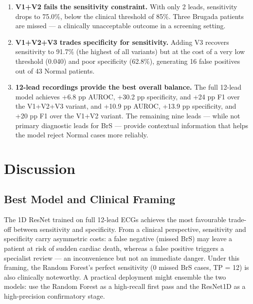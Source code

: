 \documentclass[journal, 10pt, twoside]{IEEEtran}
\begin{document}
\begin{enumerate}
  \item \textbf{V1+V2 fails the sensitivity constraint.}
        With only 2 leads, sensitivity drops to 75.0\%, below the
        clinical threshold of 85\%.
        Three Brugada patients are missed — a clinically unacceptable
        outcome in a screening setting.

  \item \textbf{V1+V2+V3 trades specificity for sensitivity.}
        Adding V3 recovers sensitivity to 91.7\% (the highest of all
        variants) but at the cost of a very low threshold (0.040)
        and poor specificity (62.8\%), generating 16 false positives
        out of 43 Normal patients.

  \item \textbf{12-lead recordings provide the best overall balance.}
        The full 12-lead model achieves +6.8 pp AUROC,
        +30.2 pp specificity, and +24 pp F1 over the V1+V2+V3 variant,
        and +10.9 pp AUROC, +13.9 pp specificity, and +20 pp F1 over
        the V1+V2 variant.
        The remaining nine leads — while not primary diagnostic leads
        for BrS — provide contextual information that helps the model
        reject Normal cases more reliably.
\end{enumerate}

\section{Discussion}
\label{sec:discussion}

\subsection{Best Model and Clinical Framing}

The 1D ResNet trained on full 12-lead ECGs achieves the most favourable
trade-off between sensitivity and specificity.
From a clinical perspective, sensitivity and specificity carry asymmetric
costs: a false negative (missed BrS) may leave a patient at risk of
sudden cardiac death, whereas a false positive triggers a specialist
review — an inconvenience but not an immediate danger.
Under this framing, the Random Forest's perfect sensitivity
(0 missed BrS cases, TP = 12) is also clinically noteworthy.
A practical deployment might ensemble the two models: use the
Random Forest as a high-recall first pass and the ResNet1D as a
high-precision confirmatory stage.
\end{document}

